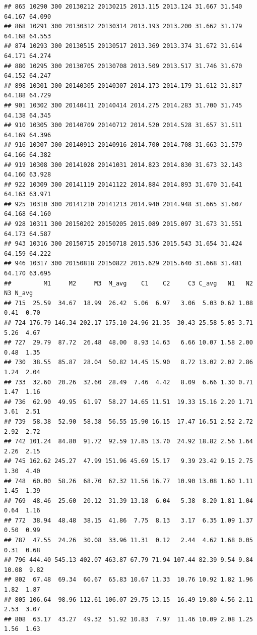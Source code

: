 \documentclass[]{article}
\begin{document}
\begin{verbatim}
## 865 10290 300 20130212 20130215 2013.115 2013.124 31.667 31.540 64.167 64.090
## 868 10291 300 20130312 20130314 2013.193 2013.200 31.662 31.179 64.168 64.553
## 874 10293 300 20130515 20130517 2013.369 2013.374 31.672 31.614 64.171 64.274
## 880 10295 300 20130705 20130708 2013.509 2013.517 31.746 31.670 64.152 64.247
## 898 10301 300 20140305 20140307 2014.173 2014.179 31.612 31.817 64.188 64.729
## 901 10302 300 20140411 20140414 2014.275 2014.283 31.700 31.745 64.138 64.345
## 910 10305 300 20140709 20140712 2014.520 2014.528 31.657 31.511 64.169 64.396
## 916 10307 300 20140913 20140916 2014.700 2014.708 31.663 31.579 64.166 64.382
## 919 10308 300 20141028 20141031 2014.823 2014.830 31.673 32.143 64.160 63.928
## 922 10309 300 20141119 20141122 2014.884 2014.893 31.670 31.641 64.163 63.971
## 925 10310 300 20141210 20141213 2014.940 2014.948 31.665 31.607 64.168 64.160
## 928 10311 300 20150202 20150205 2015.089 2015.097 31.673 31.551 64.173 64.587
## 943 10316 300 20150715 20150718 2015.536 2015.543 31.654 31.424 64.159 64.222
## 946 10317 300 20150818 20150822 2015.629 2015.640 31.668 31.481 64.170 63.695
##         M1     M2     M3  M_avg    C1    C2     C3 C_avg   N1   N2    N3 N_avg
## 715  25.59  34.67  18.99  26.42  5.06  6.97   3.06  5.03 0.62 1.08  0.41  0.70
## 724 176.79 146.34 202.17 175.10 24.96 21.35  30.43 25.58 5.05 3.71  5.26  4.67
## 727  29.79  87.72  26.48  48.00  8.93 14.63   6.66 10.07 1.58 2.00  0.48  1.35
## 730  38.55  85.87  28.04  50.82 14.45 15.90   8.72 13.02 2.02 2.86  1.24  2.04
## 733  32.60  20.26  32.60  28.49  7.46  4.42   8.09  6.66 1.30 0.71  1.47  1.16
## 736  62.90  49.95  61.97  58.27 14.65 11.51  19.33 15.16 2.20 1.71  3.61  2.51
## 739  58.38  52.90  58.38  56.55 15.90 16.15  17.47 16.51 2.52 2.72  2.92  2.72
## 742 101.24  84.80  91.72  92.59 17.85 13.70  24.92 18.82 2.56 1.64  2.26  2.15
## 745 162.62 245.27  47.99 151.96 45.69 15.17   9.39 23.42 9.15 2.75  1.30  4.40
## 748  60.00  58.26  68.70  62.32 11.56 16.77  10.90 13.08 1.60 1.11  1.45  1.39
## 769  48.46  25.60  20.12  31.39 13.18  6.04   5.38  8.20 1.81 1.04  0.64  1.16
## 772  38.94  48.48  38.15  41.86  7.75  8.13   3.17  6.35 1.09 1.37  0.50  0.99
## 787  47.55  24.26  30.08  33.96 11.31  0.12   2.44  4.62 1.68 0.05  0.31  0.68
## 796 444.40 545.13 402.07 463.87 67.79 71.94 107.44 82.39 9.54 9.84 10.08  9.82
## 802  67.48  69.34  60.67  65.83 10.67 11.33  10.76 10.92 1.82 1.96  1.82  1.87
## 805 106.64  98.96 112.61 106.07 29.75 13.15  16.49 19.80 4.56 2.11  2.53  3.07
## 808  63.17  43.27  49.32  51.92 10.83  7.97  11.46 10.09 2.08 1.25  1.56  1.63

\end{verbatim}
\end{document}
